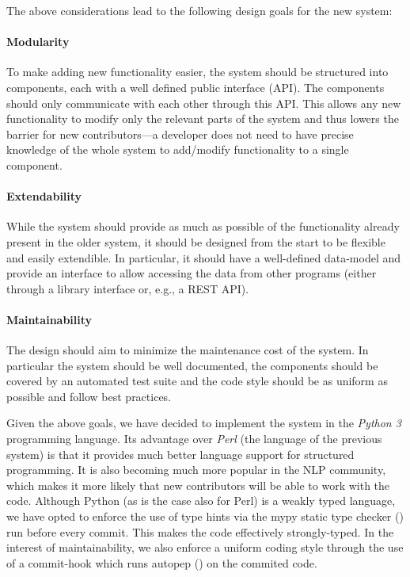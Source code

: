 \documentclass[10pt, a4paper, twocolumn]{article} %
\begin{document}
The above considerations lead to the following design goals for the new system:

\paragraph{Modularity} To make adding new functionality easier, the system should be structured
into components, each with a well defined public interface (API). The components should only communicate
with each other through this API. This allows any new functionality to modify only the
relevant parts of the system and thus lowers the barrier for new contributors---a developer does
not need to have precise knowledge of the whole system to add/modify functionality to a single component.

\paragraph{Extendability} While the system should provide as much as possible of the functionality
already present in the older system, it should be designed from the start to be flexible and easily
extendible. In particular, it should have a well-defined data-model and provide an interface to allow
accessing the data from other programs (either through a library interface or, e.g., a REST API).

\paragraph{Maintainability} The design should aim to minimize the maintenance cost of the system.
In particular the system should be well documented, the components should be covered by an automated
test suite and the code style should be as uniform as possible and follow best practices.

Given the above goals, we have decided to implement the system in the \emph{Python 3} programming
language. Its advantage over \emph{Perl} (the language of the previous system) is that it provides
much better language support for structured programming. It is also becoming much more popular in
the NLP community, which makes it more likely that new contributors will be able to work with the
code. Although Python (as is the case also for Perl) is a weakly typed language, we have opted
to enforce the use of type hints via the mypy static type checker (\cite{tool:mypy}) run before every commit.
This makes the code effectively strongly-typed. In the interest of maintainability, we also enforce
a uniform coding style through the use of a commit-hook which runs autopep (\cite{tool:autopep8})
on the commited code.
\end{document}

